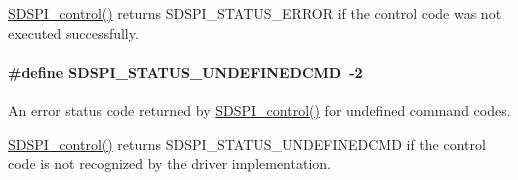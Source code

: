 \hyperlink{_s_d_s_p_i_8h_a541a1db109382fe090ed7a9209a34f61}{S\+D\+S\+P\+I\+\_\+control()} returns S\+D\+S\+P\+I\+\_\+\+S\+T\+A\+T\+U\+S\+\_\+\+E\+R\+R\+O\+R if the control code was not executed successfully. 
\paragraph[{S\+D\+S\+P\+I\+\_\+\+S\+T\+A\+T\+U\+S\+\_\+\+U\+N\+D\+E\+F\+I\+N\+E\+D\+C\+M\+D}]{\setlength{\rightskip}{0pt plus 5cm}\#define S\+D\+S\+P\+I\+\_\+\+S\+T\+A\+T\+U\+S\+\_\+\+U\+N\+D\+E\+F\+I\+N\+E\+D\+C\+M\+D~-\/2}\label{group___s_d_s_p_i___s_t_a_t_u_s_gaf65a39f487c0da299c3e0fc77a70a4c3}


An error status code returned by \hyperlink{_s_d_s_p_i_8h_a541a1db109382fe090ed7a9209a34f61}{S\+D\+S\+P\+I\+\_\+control()} for undefined command codes. 

\hyperlink{_s_d_s_p_i_8h_a541a1db109382fe090ed7a9209a34f61}{S\+D\+S\+P\+I\+\_\+control()} returns S\+D\+S\+P\+I\+\_\+\+S\+T\+A\+T\+U\+S\+\_\+\+U\+N\+D\+E\+F\+I\+N\+E\+D\+C\+M\+D if the control code is not recognized by the driver implementation. 